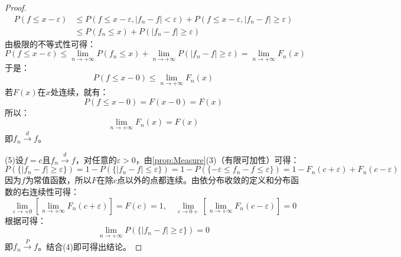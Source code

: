 \begin{proof}
	\begin{align*}
		P(f\leqslant x-\varepsilon)&\leqslant P(f\leqslant x-\varepsilon,|f_n-f|<\varepsilon)+P(f\leqslant x-\varepsilon,|f_n-f|\geqslant \varepsilon) \\
		&\leqslant P(f_n\leqslant x)+P(|f_n-f|\geqslant\varepsilon)
	\end{align*}
	由极限的不等式性可得：
	\begin{equation*}
		P(f\leqslant x-\varepsilon)\leqslant\lim_{n\to+\infty}P(f_n\leqslant x)+\lim_{n\to+\infty}P(|f_n-f|\geqslant\varepsilon)=\lim_{n\to+\infty}F_n(x)
	\end{equation*}
	于是：
	\begin{equation*}
		P(f\leqslant x-0)\leqslant\lim_{n\to+\infty}F_n(x)
	\end{equation*}
	若$F(x)$在$x$处连续，就有：
	\begin{equation*}
		P(f\leqslant x-0)=F(x-0)=F(x)
	\end{equation*}
	所以：
	\begin{equation}
		\lim_{n\to+\infty}F_n(x)=F(x)
	\end{equation}
	即$f_n\overset{d}{\longrightarrow}f$。\par
	(5)设$f=c$且$f_n\overset{d}{\longrightarrow}f$，对任意的$\varepsilon>0$，由\cref{prop:Measure}(3)（有限可加性）可得：
	\begin{equation*}
		P(\{|f_n-f|\geqslant\varepsilon\})=1-P(\{|f_n-f|\leqslant\varepsilon\})=1-P(\{-\varepsilon\leqslant f_n-f\leqslant\varepsilon\})=1-F_n(c+\varepsilon)+F_n(c-\varepsilon)
	\end{equation*}
	因为$f$为常值函数，所以$F$在除$c$点以外的点都连续。由依分布收敛的定义和分布函数的右连续性可得：
	\begin{equation*}
		\lim_{\varepsilon\to+0}\left[\lim_{n\to+\infty}F_n(c+\varepsilon)\right]=F(c)=1,\quad\lim_{\varepsilon\to0+}\left[\lim_{n\to+\infty}F_n(c-\varepsilon)\right]=0
	\end{equation*}
	根据可得：
	\begin{equation*}
		\lim_{n\to+\infty}P(\{|f_n-f|\geqslant\varepsilon\})=0
	\end{equation*}
	即$f_n\overset{P}{\longrightarrow}f$。结合(4)即可得出结论。
\end{proof}
